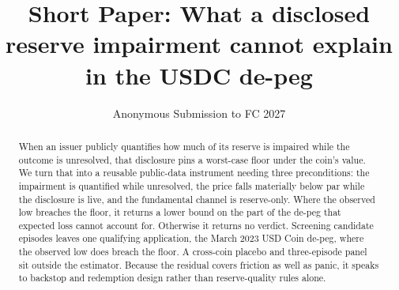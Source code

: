 \title{Short Paper: What a disclosed reserve impairment cannot explain in the USDC
de-peg}
\author{Anonymous Submission to FC 2027}
\institute{}

\maketitle

\begin{abstract}
When an issuer publicly quantifies how much of its reserve is impaired while the
outcome is unresolved, that disclosure pins a worst-case floor under the coin's
value. We turn that into a reusable public-data instrument needing three
preconditions: the impairment is quantified while unresolved, the price falls
materially below par while the disclosure is live, and the fundamental channel is
reserve-only. Where the observed low breaches the floor, it returns a lower bound on
the part of the de-peg that expected loss cannot account for. Otherwise it returns no
verdict. Screening candidate episodes leaves one qualifying application, the March
2023 USD Coin de-peg, where the observed low does breach the floor. A cross-coin
placebo and three-episode panel sit outside the estimator. Because the residual covers
friction as well as panic, it speaks to backstop and redemption design rather than
reserve-quality rules alone.

\end{abstract}
